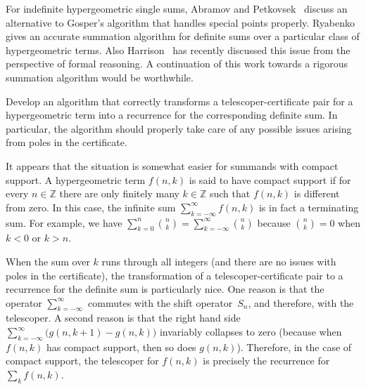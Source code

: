 \documentclass{jssc}
\let\set\mathbb
\begin{document}
 For indefinite hypergeometric single sums, Abramov and Petkovsek~\cite{abramov05}
 discuss an alternative to Gosper's algorithm that handles special points
 properly. Ryabenko~\cite{ryabenko11} gives an accurate summation algorithm for
 definite sums over a particular class of hypergeometric terms.
 Also Harrison~\cite{harrison15} has recently discussed this issue from the perspective
 of formal reasoning. A continuation of this work towards a rigorous summation algorithm
 would be worthwhile.

 \begin{problem}
   Develop an algorithm that correctly transforms a telescoper-certificate pair
   for a hypergeometric term into a recurrence for the corresponding definite
   sum.  In particular, the algorithm should properly take care of any possible
   issues arising from poles in the certificate.
 \end{problem}

 It appears that the situation is somewhat easier for summands with compact
 support. A hypergeometric term $f(n,k)$ is said to have compact support if for
 every $n\in\set Z$ there are only finitely many $k\in\set Z$ such that $f(n,k)$
 is different from zero. In this case, the infinite sum $\sum_{k=-\infty}^\infty
 f(n,k)$ is in fact a terminating sum. For example, we have $\sum_{k=0}^n\binom
 nk=\sum_{k=-\infty}^\infty\binom nk$ because $\binom nk=0$ when $k<0$ or $k>n$.

 When the sum over $k$ runs through all integers (and there are no issues with
 poles in the certificate), the transformation of a telescoper-certificate pair
 to a recurrence for the definite sum is particularly nice. One reason is that
 the operator $\sum_{k=-\infty}^\infty$ commutes with the shift operator~$S_n$,
 and therefore, with the telescoper. A second reason is that the right hand side
 $\sum_{k=-\infty}^\infty\bigl(g(n,k+1)-g(n,k)\bigr)$ invariably collapses to
 zero (because when $f(n,k)$ has compact support, then so does
 $g(n,k)$). Therefore, in the case of compact support, the telescoper for
 $f(n,k)$ is precisely the recurrence for $\sum_k f(n,k)$.
\end{document}
